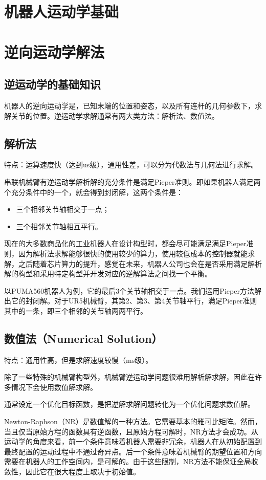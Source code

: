 \chapter{机器人运动学基础}
\chapter{逆向运动学解法}
\section{逆运动学的基础知识}
机器人的逆向运动学是，已知末端的位置和姿态，以及所有连杆的几何参数下，求解关节的位置。逆运动学求解通常有两大类方法：解析法、数值法。
\section{解析法}
特点：运算速度快（达到us级），通用性差，可以分为代数法与几何法进行求解。

串联机械臂有逆运动学解析解的充分条件是满足Pieper准则。即如果机器人满足两个充分条件中的一个，就会得到封闭解，这两个条件是：
\begin{itemize}
  \item 三个相邻关节轴相交于一点；
  \item 三个相邻关节轴相互平行。
\end{itemize}

现在的大多数商品化的工业机器人在设计构型时，都会尽可能满足满足Pieper准则，因为解析法求解能够很快的使用较少的算力，使用较低成本的控制器就能求解，之后随着芯片算力的提升，感觉在未来，机器人公司也会在是否采用满足解析解的构型和采用特定构型并开发对应的逆解算法之间找一个平衡。

以PUMA560机器人为例，它的最后3个关节轴相交于一点。我们运用Pieper方法解出它的封闭解。对于UR5机械臂，其第2、第3、第4关节轴平行，满足Pieper准则其中的一条，即三个相邻的关节轴两两平行。

\section{数值法（Numerical Solution）}
特点：通用性高，但是求解速度较慢（ms级）。

除了一些特殊的机械臂构型外，机械臂逆运动学问题很难用解析解求解，因此在许多情况下会使用数值解求解。

通常设定一个优化目标函数，是把逆解求解问题转化为一个优化问题求数值解。

Newton-Raphson（NR）是数值解的一种方法。它需要基本的雅可比矩阵。然而，当且仅当原始方程的函数具有逆函数，且原始方程可解时，NR方法才会成功。从运动学的角度来看，前一个条件意味着机器人需要非冗余，机器人在从初始配置到最终配置的运动过程中不通过奇异点。后一个条件意味着机械臂的期望位置和方向需要在机器人的工作空间内，是可解的。由于这些限制，NR方法不能保证全局收敛性，因此它在很大程度上取决于初始值。

